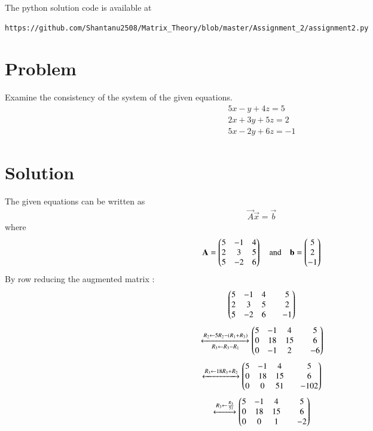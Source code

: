 \documentclass[journal,12pt,twocolumn]{IEEEtran}
\begin{document}
The python solution code is available at
\begin{lstlisting}
https://github.com/Shantanu2508/Matrix_Theory/blob/master/Assignment_2/assignment2.py
\end{lstlisting}
%
\section{Problem}
Examine the consistency of the system of the given equations.
\begin{align}
	5x -  y + 4z = 5 \nonumber \\
	2x + 3y + 5z = 2 \\
	5x - 2y + 6z =-1 \nonumber
\end{align}
\section{Solution}
	The given equations can be written as
\begin{align*}
	\vec{A} \vec{x} = \vec{b}  
\end{align*}
where
\begin{align}
	\mathbf{A} = \begin{pmatrix} 5 & -1 & 4 \\ 2 &  3 & 5 \\ 5 & -2 & 6 \end{pmatrix}
	\quad \text{and} \quad
	\mathbf{b} = \begin{pmatrix} 5 \\  2 \\ -1\end{pmatrix}
\end{align}
By row reducing the augmented matrix :
\begin{align}
	\begin{pmatrix} 5 & -1 & 4 & & 5 \\ 2 & 3 & 5 & & 2 \\ 5 & -2 & 6 & & -1\end{pmatrix}
\end{align}
\begin{align}
	\xleftrightarrow[R_3 \leftarrow R_3-R_1]{R_2 \leftarrow 5R_2-(R_1+R_3)}
	\begin{pmatrix}5 &-1  & 4  & & 5 \\ 0 & 18 & 15 & & 6 \\ 0 & -1 & 2 & & -6\end{pmatrix}
\end{align}
\begin{align}
	\xleftrightarrow[]{R_3 \leftarrow 18R_3+R_2}
	\begin{pmatrix}5 & -1 &  4 & & 5 \\ 0 & 18 & 15 & & 6 \\ 0 & 0 & 51 & & -102\end{pmatrix}
\end{align}
\begin{align}
	\xleftrightarrow[]{R_3 \leftarrow \frac{R_3}{51}}
	\begin{pmatrix}5 & -1 &  4 & & 5 \\ 0 & 18 & 15 & & 6 \\ 0 & 0 & 1 & & -2\end{pmatrix}
\end{align}
\end{document}
